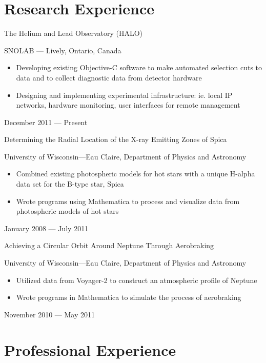 \documentclass{cv}
\begin{document}
\begin{resume}
\newpage

\section{Research Experience}



\object
{The Helium and Lead Observatory (HALO)}
{SNOLAB --- Lively, Ontario, Canada \noemph
	\begin{itemize}
		\item Developing existing Objective-C software to make automated selection cuts to data and to collect diagnostic data from detector hardware
		\item Designing and implementing experimental infrastructure: ie. local IP networks, hardware monitoring, user interfaces for remote management
	\end{itemize}
 }
{December 2011 --- Present}


\objectLarge
{Determining the Radial Location of the X-ray Emitting}
{Zones of Spica}
{University of Wisconsin---Eau Claire, Department of Physics and Astronomy \noemph
\begin{itemize}
		\item Combined existing photospheric models for hot stars with a unique H-alpha data set for the B-type star, Spica
		\item Wrote programs using Mathematica to process and visualize data from photospheric models of hot stars
	\end{itemize}
 }
{January 2008 --- July 2011}


\objectLarge
{Achieving a Circular Orbit Around Neptune}
{Through Aerobraking}
{University of Wisconsin---Eau Claire, Department of Physics and Astronomy \noemph
\begin{itemize}
		\item Utilized data from Voyager-2 to construct an atmospheric profile of Neptune
		\item Wrote programs in Mathematica to simulate the process of aerobraking
	\end{itemize}
 }
{November 2010 --- May 2011}



\section{Professional Experience}




\end{resume}
\end{document}
